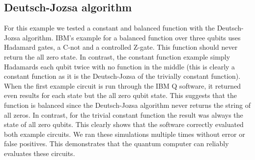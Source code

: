 \documentclass[12pt]{article}
\begin{document}
    \subsection{Deutsch-Jozsa algorithm}
        For this example we tested a constant and balanced function with the Deutsch-Jozsa algorithm. IBM's example for a balanced function over three qubits uses Hadamard gates, a C-not and a controlled Z-gate. This function should never return the all zero state. In contrast, the constant function example simply Hadamards each qubit twice with no function in the middle (this is clearly a constant function as it is the Deutsch-Jozsa of the trivially constant function). When the first example circuit is run through the IBM Q software, it returned even results for each state but the all zero qubit state. This suggests that the function is balanced since the Deutsch-Jozsa algorithm never returns the string of all zeros. In contrast, for the trivial constant function the result was always the state of all zero qubits. This clearly shows that the software correctly evaluated both example circuits. We ran these simulations multiple times without error or false positives. This demonstrates that the quantum computer can reliably evaluates these circuits.
\end{document}
